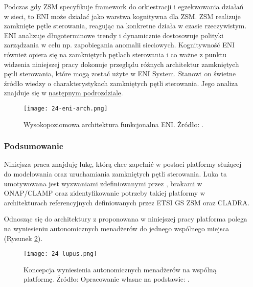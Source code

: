 Podczas gdy ZSM specyfikuje framework do orkiestracji i egzekwowania działań w sieci, to ENI może działać jako warstwa kognitywna dla ZSM. ZSM realizuje zamknięte pętle sterowania, reagując na konkretne działa w czasie rzeczywistym. ENI analizuje długoterminowe trendy i dynamicznie dostosowuje polityki zarządzania w celu np. zapobiegania anomalii sieciowych. Kognitywność ENI również opiera się na zamkniętych pętlach sterowania i co ważne z punktu widzenia niniejszej pracy \cite{etsieni2024} dokonuje przeglądu różnych architektur zamkniętych pętli sterowania, które mogą zostać użyte w ENI System. Stanowi on świetne źródło wiedzy o charakterystykach zamkniętych pętli sterowania. Jego analiza znajduje się w \hyperlink{sec:25}{następnym podrozdziale}.



\begin{figure}[!h]
    \centering \texttt{[image: 24-eni-arch.png]}
    \caption{Wysokopoziomowa architektura funkcjonalna ENI. Źródło: \cite{etsieni2023}.}\label{fig:24-eni-arch}
\end{figure}


\subsubsection{Podsumowanie}

Niniejsza praca znajduję lukę, którą chce zapełnić w postaci platformy służącej do modelowania oraz uruchamiania zamkniętych pętli sterowania. Luka ta umotywowana jest \hyperlink{list:1}{wyzwaniami zdefiniowanymi przez \cite{fallon2019}}, brakami w ONAP/CLAMP oraz zidentyfikowanie potrzeby takiej platformy w architekturach referencyjnych definiowanych przez ETSI GS ZSM oraz CLADRA.

Odnosząc się do architektury z \cite{kephart2003} proponowana w niniejszej pracy platforma polega na wyniesieniu autonomicznych menadżerów do jednego wspólnego miejsca (Rysunek \ref{fig:24-lupus}).

\begin{figure}[!htbp]
    \centering \texttt{[image: 24-lupus.png]}
    \caption{Koncepcja wyniesienia autonomicznych menadżerów na wspólną platformę. Źródło: Opracowanie własne na podstawie: \cite{kephart2003}.}\label{fig:24-lupus}
\end{figure}